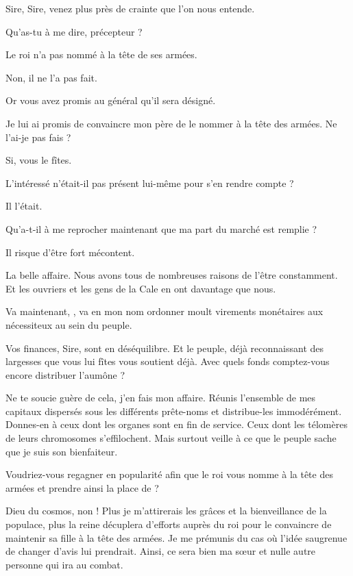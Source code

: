 \begin{drama}
  \alexasspeaks Sire, Sire, venez plus près de crainte que l’on nous entende.

  \elenaspeaks Qu’as-tu à me dire, précepteur ?

  \alexasspeaks Le roi n’a pas nommé \general à la tête de ses armées.

  \elenaspeaks Non, il ne l’a pas fait.

  \alexasspeaks Or vous avez promis au général qu’il sera désigné.

  \elenaspeaks Je lui ai promis de convaincre mon père de le nommer à la tête des armées. Ne l’ai-je pas fais ?

  \alexasspeaks Si, vous le fîtes.

  \elenaspeaks L’intéressé n’était-il pas présent lui-même pour s’en rendre compte ?

  \alexasspeaks Il l’était.

  \elenaspeaks Qu’a-t-il à me reprocher maintenant que ma part du marché est remplie ?

  \alexasspeaks Il risque d’être fort mécontent.

  \elenaspeaks La belle affaire. Nous avons tous de nombreuses raisons de l’être constamment. Et les ouvriers et les gens de la Cale en ont davantage que nous.

  Va maintenant, \alexas, va en mon nom ordonner moult virements monétaires aux nécessiteux au sein du peuple.

  \alexasspeaks Vos finances, Sire, sont en déséquilibre. Et le peuple, déjà reconnaissant des largesses que vous lui fîtes vous soutient déjà. Avec quels fonds comptez-vous encore distribuer l’aumône ?

  \elenaspeaks Ne te soucie guère de cela, j’en fais mon affaire. Réunis l’ensemble de mes capitaux dispersés sous les différents prête-noms et distribue-les immodérément. 
  Donnes-en à ceux dont les organes sont en fin de service. Ceux dont les télomères de leurs chromosomes s’effilochent. Mais surtout veille à ce que le peuple sache que je suis son bienfaiteur.

  \alexasspeaks Voudriez-vous regagner en popularité afin que le roi vous nomme à la tête des armées et prendre ainsi la place de \general ?

  \elenaspeaks Dieu du cosmos, non ! Plus je m’attirerais les grâces et la bienveillance de la populace, plus la reine décuplera d’efforts auprès du roi pour le convaincre de maintenir sa fille à la tête des armées. Je me prémunis du cas où  l’idée saugrenue de changer d’avis lui prendrait. Ainsi, ce sera bien ma sœur et nulle autre personne qui ira au combat.


\end{drama}
